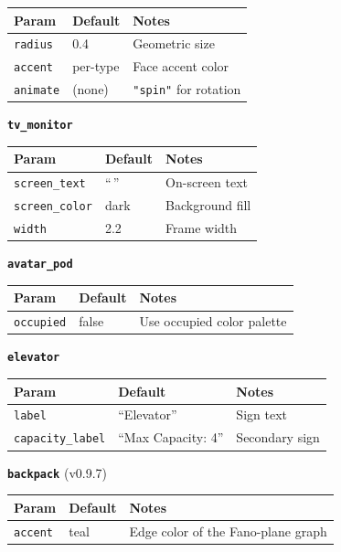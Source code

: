 \documentclass[
  12pt,
  letterpaper,
]{book}
\begin{document}
\begin{longtable}[]{@{}lll@{}}
\toprule\noalign{}
Param & Default & Notes \\
\midrule\noalign{}
\endhead
\bottomrule\noalign{}
\endlastfoot
\texttt{radius} & 0.4 & Geometric size \\
\texttt{accent} & per-type & Face accent color \\
\texttt{animate} & (none) & \texttt{"spin"} for rotation \\
\end{longtable}

\textbf{\texttt{tv\_monitor}}

\begin{longtable}[]{@{}lll@{}}
\toprule\noalign{}
Param & Default & Notes \\
\midrule\noalign{}
\endhead
\bottomrule\noalign{}
\endlastfoot
\texttt{screen\_text} & ``\,'' & On-screen text \\
\texttt{screen\_color} & dark & Background fill \\
\texttt{width} & 2.2 & Frame width \\
\end{longtable}

\textbf{\texttt{avatar\_pod}}

\begin{longtable}[]{@{}lll@{}}
\toprule\noalign{}
Param & Default & Notes \\
\midrule\noalign{}
\endhead
\bottomrule\noalign{}
\endlastfoot
\texttt{occupied} & false & Use occupied color palette \\
\end{longtable}

\textbf{\texttt{elevator}}

\begin{longtable}[]{@{}lll@{}}
\toprule\noalign{}
Param & Default & Notes \\
\midrule\noalign{}
\endhead
\bottomrule\noalign{}
\endlastfoot
\texttt{label} & ``Elevator'' & Sign text \\
\texttt{capacity\_label} & ``Max Capacity: 4'' & Secondary sign \\
\end{longtable}

\textbf{\texttt{backpack}} (v0.9.7)

\begin{longtable}[]{@{}lll@{}}
\toprule\noalign{}
Param & Default & Notes \\
\midrule\noalign{}
\endhead
\bottomrule\noalign{}
\endlastfoot
\texttt{accent} & teal & Edge color of the Fano-plane graph \\
\end{longtable}
\end{document}
